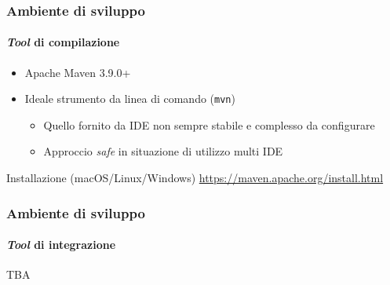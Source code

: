 \begin{frame}[t,fragile] \frametitle{Ambiente di sviluppo}
\framesubtitle{\textit{Tool} di compilazione}
    \begin{itemize}[leftmargin=20pt,align=right]
        \item[\alert{\faHandORight}] Apache Maven \alert{3.9.0+}
        \item[\alert{\faHandORight}] Ideale strumento da \alert{linea di comando} (\texttt{mvn})
        \begin{itemize}[leftmargin=20pt,align=right]
            \item[\alert{\faHandORight}] Quello fornito da IDE non sempre stabile e complesso da configurare
            \item[\alert{\faHandORight}] Approccio \textit{safe} in situazione di utilizzo multi IDE
        \end{itemize}
    \end{itemize}
    \begin{block}{Installazione (macOS/Linux/Windows)}
        \url{https://maven.apache.org/install.html}
    \end{block}
\end{frame}
%
\begin{frame}[t,fragile] \frametitle{Ambiente di sviluppo}
\framesubtitle{\textit{Tool} di integrazione}
TBA
\end{frame}    
%
